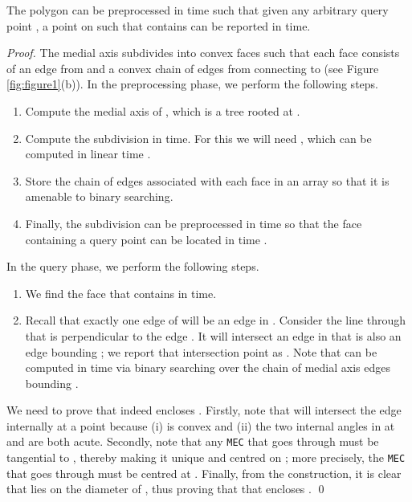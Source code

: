 \documentclass[12pt]{llncs}
\begin{document}
\begin{lemma}\label{llx}
The polygon  can be preprocessed in  time such that given any
arbitrary query point , a point  on  such that  contains  
can be 
reported in  time. 
\end{lemma}
\begin{proof}
The medial axis  subdivides   into  convex faces 
such that each face  consists of an edge  from 
and a convex chain of edges from  connecting  to  (see Figure 
\ref{fig:figure1}(b)). In the preprocessing phase, we perform the following steps.
\begin{enumerate}
\item Compute the medial axis  of , which is a tree rooted at .
\item Compute the subdivision  in  time. For this we will need , which 
can be computed in linear time \cite{CSW99}. 
\item Store the chain of edges associated with each face in an array so that it is 
amenable to binary searching.
\item Finally, the subdivision can be 
preprocessed in  time so that the face containing a query point 
 can be located in  time \cite{Krik83}.  
\end{enumerate}
 
In the query phase, we perform the following steps.
\begin{enumerate}
\item  We find the face  that contains  in  time. 

\item Recall that exactly one edge
 of  will be an edge in .  Consider the line  through  
that is perpendicular to the edge . It will intersect an edge in  that is 
also an edge bounding ;  we report that intersection point 
as . Note that  can be computed in  time via binary searching over the chain of medial axis edges bounding .
\end{enumerate}
We need to  prove that  indeed encloses .  Firstly, note that  
will  intersect the edge  internally at a point  because (i)  is 
convex and (ii) the two internal angles in  at  and  are both acute.  
Secondly, note that any {\tt MEC} that goes through  must be tangential to , thereby making it unique and centred on ; more precisely, the {\tt MEC} 
that goes through  must be centred at . Finally, from the construction, it is clear 
that  lies on the diameter of  , thus proving that that  
encloses . 
\qed
\end{proof}
\end{document}
